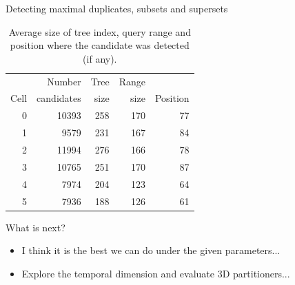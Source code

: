 \documentclass{beamer}
\begin{document}
\begin{frame}{Detecting maximal duplicates, subsets and supersets}{}
        \begin{table}[ht]
                \centering
                \begin{tabular}{rrrrr}
                        \toprule
                               & Number & Tree & Range &  \\
                        Cell & candidates & size & size & Position \\
                        \midrule
                        0 & 10393 & 258 & 170 & 77 \\
                        1 & 9579 & 231 & 167 & 84 \\
                        2 & 11994 & 276 & 166 & 78 \\
                        3 & 10765 & 251 & 170 & 87 \\
                        4 & 7974 & 204 & 123 & 64 \\
                        5 & 7936 & 188 & 126 & 61 \\
                        \bottomrule
                \end{tabular}
                \caption{Average size of tree index, query range and position where the candidate was detected (if
any).}
        \end{table}
\end{frame}

\begin{frame}{What is next?}
        \centering
        \begin{itemize}
                \item I think it is the best we can do under the given parameters...
                \item Explore the temporal dimension and evaluate 3D partitioners...
        \end{itemize}
\end{frame}
\end{document}
